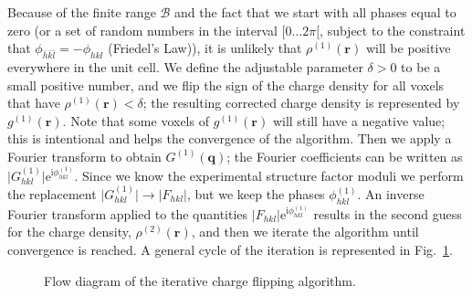 Because of the finite range $\mathcal{B}$ and the fact that we start with all phases equal to zero (or a set of random numbers in the interval $[0\ldots 2\pi[$, subject to the constraint that $\phi_{\bar{h}\bar{k}\bar{l}}=-\phi_{hkl}$ (Friedel's Law)), it is unlikely that $\rho^{(1)}(\mathbf{r})$ will be positive everywhere in the unit cell.  We define the adjustable parameter $\delta>0$ to be a small positive number, and we flip the sign of the charge density for all voxels that have  $\rho^{(1)}(\mathbf{r})<\delta$; the resulting corrected charge density is represented by $g^{(1)}(\mathbf{r})$. Note that some voxels of $g^{(1)}(\mathbf{r})$ will still have a negative value; this is intentional and helps the convergence of the algorithm. Then we apply a Fourier transform to obtain $G^{(1)}(\mathbf{q})$; the Fourier coefficients can be written as $\vert G^{(1)}_{hkl}\vert \mathrm{e}^{\mathrm{i}\phi^{(1)}_{hkl}}$. Since we know the experimental structure factor moduli we perform the replacement $\vert G^{(1)}_{hkl}\vert\rightarrow \vert F_{hkl}\vert$, but we keep the phases $\phi^{(1)}_{hkl}$. An inverse Fourier transform applied to the quantities $\vert F_{hkl}\vert \mathrm{e}^{\mathrm{i}\phi^{(1)}_{hkl}}$ results in the second guess for the charge density, $\rho^{(2)}(\mathbf{r})$, and then we iterate the algorithm until convergence is reached. A general cycle of the iteration is represented in Fig.~\ref{\chabbr:fig:chargeflip}.

\begin{figure}[htbp]
\centering
{}
\caption{\label{\chabbr:fig:chargeflip}Flow diagram of the iterative charge flipping algorithm.}
\end{figure}

